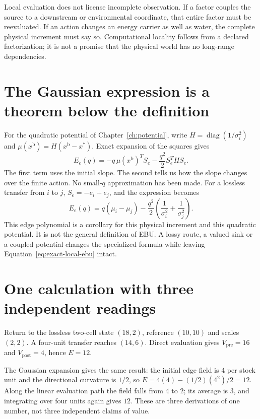 Local evaluation does not license incomplete observation. If a factor couples
the source to a downstream or environmental coordinate, that entire factor
must be reevaluated. If an action changes an energy carrier as well as water,
the complete physical increment must say so. Computational locality follows
from a declared factorization; it is not a promise that the physical world
has no long-range dependencies.

\section{The Gaussian expression is a theorem below the definition}
For the quadratic potential of Chapter~\ref{ch:potential}, write
$H=\operatorname{diag}(1/\sigma_i^2)$ and $\mu(x^{\mathrm{b}})=H(x^{\mathrm{b}}-x^*)$. Exact expansion
of the squares gives
\begin{equation}\label{eq:gaussian-exact-ebu}
 E_e(q)=-q\,\mu(x^{\mathrm{b}})^T S_e-\frac{q^2}{2}S_e^T H S_e.
\end{equation}
The first term uses the initial slope. The second tells us how the slope
changes over the finite action. No small-$q$ approximation has been made.
For a lossless transfer from $i$ to $j$, $S_e=-e_i+e_j$, and the expression
becomes
\begin{equation}
 E_e(q)=q(\mu_i-\mu_j)
       -\frac{q^2}{2}\left(\frac1{\sigma_i^2}+\frac1{\sigma_j^2}\right).
\end{equation}
This edge polynomial is a corollary for this physical increment and this
quadratic potential. It is not the general definition of EBU. A lossy route,
a valued sink or a coupled potential changes the specialized formula while
leaving Equation~\ref{eq:exact-local-ebu} intact.

\section{One calculation with three independent readings}
Return to the lossless two-cell state $(18,2)$, reference $(10,10)$ and
scales $(2,2)$. A four-unit transfer reaches $(14,6)$. Direct evaluation
gives $V_{\mathrm{pre}}=16$ and $V_{\mathrm{post}}=4$, hence $E=12$.

The Gaussian expansion gives the same result: the initial edge field is
$4$ per stock unit and the directional curvature is $1/2$, so
$E=4(4)-(1/2)(4^2)/2=12$. Along the linear evaluation path the field falls
from $4$ to $2$; its average is $3$, and integrating over four units again
gives $12$. These are three derivations of one number, not three independent
claims of value.

